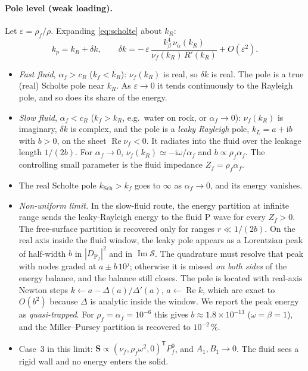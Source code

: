 \documentclass[11pt,a4paper]{article}
\newcommand{\ii}{\mathrm{i}}
\newcommand{\RE}{\operatorname{Re}}
\newcommand{\IM}{\operatorname{Im}}
\begin{document}
\paragraph{Pole level (weak loading).} Let $\varepsilon=\rho_f/\rho$. Expanding
\eqref{eq:scholte} about $k_R$:
\begin{equation}
  k_p=k_R+\delta k,\qquad
  \delta k=-\,\varepsilon\,\frac{k_\beta^4\,\nu_\alpha(k_R)}{\nu_f(k_R)\,R'(k_R)}+O(\varepsilon^2).
  \label{eq:dk}
\end{equation}
\begin{itemize}
  \item \emph{Fast fluid}, $\alpha_f>c_R$ ($k_f<k_R$): $\nu_f(k_R)$ is real, so $\delta k$ is real.
  The pole is a true (real) Scholte pole near $k_R$. As $\varepsilon\to0$ it tends continuously to
  the Rayleigh pole, and so does its share of the energy.
  \item \emph{Slow fluid}, $\alpha_f<c_R$ ($k_f>k_R$, e.g.\ water on rock, or $\alpha_f\to0$):
  $\nu_f(k_R)$ is imaginary, $\delta k$ is complex, and the pole is a \emph{leaky Rayleigh} pole,
  $k_L=a+\ii b$ with $b>0$, on the sheet $\RE\nu_f<0$. It radiates into the fluid over the leakage
  length $1/(2b)$. For $\alpha_f\to0$, $\nu_f(k_R)\simeq-\ii\omega/\alpha_f$ and
  $b\propto\rho_f\alpha_f$. The controlling small parameter is the fluid impedance
  $Z_f=\rho_f\alpha_f$.
  \item The real Scholte pole $k_{\mathrm{Sch}}>k_f$ goes to $\infty$ as $\alpha_f\to0$, and its
  energy vanishes.
  \item \emph{Non-uniform limit.} In the slow-fluid route, the energy partition at infinite range
  sends the leaky-Rayleigh energy to the fluid P wave for every $Z_f>0$. The free-surface partition
  is recovered only for ranges $r\ll1/(2b)$. On the real axis inside the fluid window, the leaky pole
  appears as a Lorentzian peak of half-width $b$ in $|D_{\mathrm P_f}|^2$ and in
  $\IM\mathcal S$. The quadrature must resolve that peak with nodes graded at $a\pm b\,10^{j}$;
  otherwise it is missed \emph{on both sides} of the energy balance, and the balance still closes.
  The pole is located with real-axis Newton steps $k\leftarrow a-\Delta(a)/\Delta'(a)$,
  $a\leftarrow\RE k$, which are exact to $O(b^2)$ because $\Delta$ is analytic inside the window.
  We report the peak energy as \emph{quasi-trapped}. For $\rho_f=\alpha_f=10^{-6}$ this gives
  $b\approx1.8\times10^{-13}$ ($\omega=\beta=1$), and the Miller--Pursey partition is recovered
  to $10^{-2}\,\%$.
  \item Case~3 in this limit: $\mathbf S\propto(\nu_f,\rho_f\omega^2,0)^{\mathsf T}P_f^0$, and
  $A_1,B_1\to0$. The fluid sees a rigid wall and no energy enters the solid.
\end{itemize}
\end{document}
